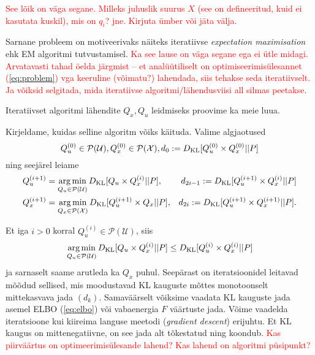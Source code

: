 \textcolor{red}{See lõik on väga segane. Milleks juhuslik suurus $X$ (see on defineeritud, kuid ei kasutata kuskil), mis on $q_i$? jne. Kirjuta ümber või jäta välja.}

Sarnane probleem on motiveerivaks näiteks iteratiivse \emph{expectation maximisation} ehk EM algoritmi tutvustamisel. \textcolor{red}{Ka see lause on väga segane ega ei ütle midagi. Arvatavasti tahad öelda järgmist -- et analüütiliselt on optimiseerimisülesannet (\ref{eq:problem}) vga keeruline (võimatu?) lahendada, siis tehakse seda iteratiivselt. Ja võiksid selgitada, mida iteratiivse algoritmi/lähendusviisi all silmas peetakse}.

Iteratiivset algoritmi lähendite $Q_x, Q_u$ leidmiseks proovime ka meie luua.

Kirjeldame, kuidas selline algoritm võiks käituda. Valime algjaotused 
$$Q_u^{(0)} \in \mathcal{P}(\mathcal{U}), Q_x^{(0)} \in \mathcal{P}(\mathcal{X}), d_0 := D_{\mathrm{KL}}[Q_u^{(0)} \times Q_x^{(0)} || P]$$
ning seejärel leiame
\begin{align*}
    Q_u^{(i+1)} &= \operatorname*{arg\,min}_{Q_u \in \mathcal{P}(\mathcal{U})} D_{\mathrm{KL}}[Q_u \times Q_x^{(i)} || P],& d_{2i -1} := D_{\mathrm{KL}}[Q_u^{(i+1)} \times Q_x^{(i)} || P] \\
     Q_x^{(i+1)} &= \operatorname*{arg\,min}_{Q_x \in \mathcal{P}(\mathcal{X})} D_{\mathrm{KL}}[Q_u^{(i+1)} \times Q_x || P],& d_{2i} := D_{\mathrm{KL}}[Q_u^{(i+1)} \times Q_x^{(i+1)} || P].
\end{align*}

Et iga $i>0$ korral $Q_u^{(i)} \in \mathcal{P}(\mathcal{U})$, siis
$$ \operatorname*{arg\,min}_{Q_u \in \mathcal{P}(\mathcal{U})} D_{\mathrm{KL}}[Q_u \times Q_x^{(i)} || P] \le D_{\mathrm{KL}}[Q_u^{(i)} \times Q_x^{(i)} || P]$$
ja sarnaselt saame arutleda ka $Q_x$ puhul. Seepärast on iteratsioonidel leitavad mõõdud sellised, mis moodustavad KL kauguste mõttes monotoonselt mittekasvava jada $(d_k)$. Samaväärselt võiksime vaadata KL kauguste jada asemel ELBO (\ref{eq:elbo}) või vabaenergia $F$ väärtuste jada. Võime vaadelda iteratsioone kui kiireima languse meetodi (\emph{gradient descent}) erijuhtu. Et KL kaugus on mittenegatiivne, on see jada alt tõkestatud ning koondub. \textcolor{red}{Kas piirväärtus on optimeerimisülesande lahend? Kas lahend on algoritmi püsipunkt?}

